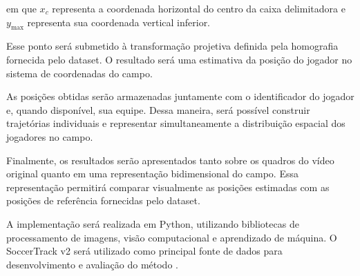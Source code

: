 em que $x_c$ representa a coordenada horizontal do centro da caixa delimitadora e $y_{\max}$ representa sua coordenada vertical inferior.

Esse ponto será submetido à transformação projetiva definida pela homografia fornecida pelo dataset. O resultado será uma estimativa da posição do jogador no sistema de coordenadas do campo.

As posições obtidas serão armazenadas juntamente com o identificador do jogador e, quando disponível, sua equipe. Dessa maneira, será possível construir trajetórias individuais e representar simultaneamente a distribuição espacial dos jogadores no campo.

Finalmente, os resultados serão apresentados tanto sobre os quadros do vídeo original quanto em uma representação bidimensional do campo. Essa representação permitirá comparar visualmente as posições estimadas com as posições de referência fornecidas pelo dataset.

A implementação será realizada em Python, utilizando bibliotecas de processamento de imagens, visão computacional e aprendizado de máquina. O SoccerTrack v2 será utilizado como principal fonte de dados para desenvolvimento e avaliação do método \cite{scott2025soccertrackv2}.
